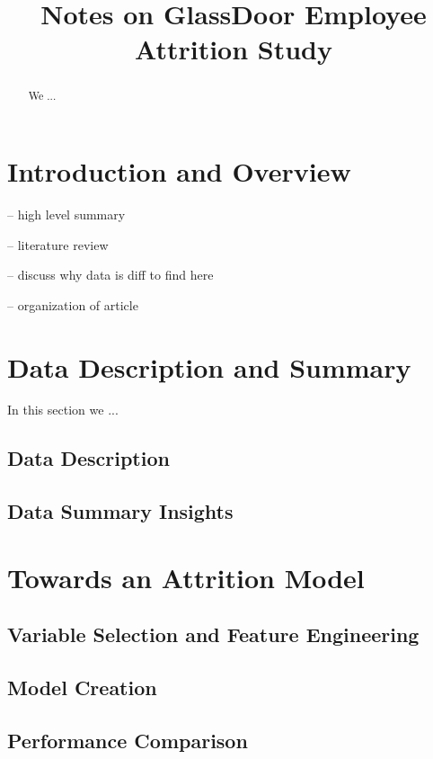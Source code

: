 \documentclass{amsart}[12pt]
\title{Notes on GlassDoor Employee Attrition Study}
\begin{document}
\maketitle

\begin{abstract}
  We ...
\end{abstract}

\section{Introduction and Overview}

-- high level summary 

-- literature review

-- discuss why data is diff to find here 

-- organization of article 

\section{Data Description and Summary} 

In this section we ... 

\subsection{Data Description}

\subsection{Data Summary Insights}

\section{Towards an Attrition Model} 

\subsection{Variable Selection and Feature Engineering} 

\subsection{Model Creation} 

\subsection{Performance Comparison}
\end{document}
